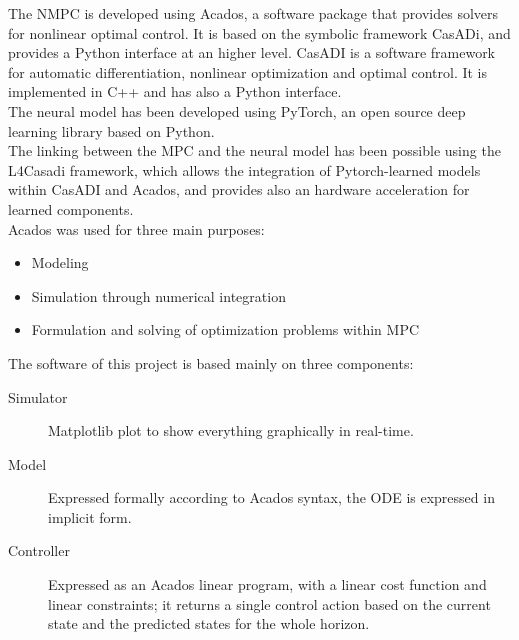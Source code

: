 The NMPC is developed using Acados, a software package that provides solvers for nonlinear optimal control.
It is based on the symbolic framework CasADi, and provides a Python interface at an higher level.
CasADI is a software framework for automatic differentiation, nonlinear optimization and 
optimal control. It is implemented in C++ and has also a Python interface.\\
The neural model has been developed using PyTorch, an open source deep learning library based on Python.\\
The linking between the MPC and the neural model has been possible using the L4Casadi framework, which allows
the integration of Pytorch-learned models within CasADI and Acados, and provides also an hardware acceleration
for learned components.\\
Acados was used for three main purposes:
\begin{itemize}
  \item Modeling
  \item Simulation through numerical integration
  \item Formulation and solving of optimization problems within MPC
\end{itemize}
The software of this project is based mainly on three components:
\begin{description}
    \item[Simulator] Matplotlib plot to show everything graphically in real-time. 
    \item[Model] Expressed formally according to Acados syntax, the ODE is expressed in implicit form.
    \item[Controller] Expressed as an Acados linear program, with a linear cost function and linear constraints; 
                    it returns a single control action based on the current state and the predicted states for
                    the whole horizon.
\end{description}

